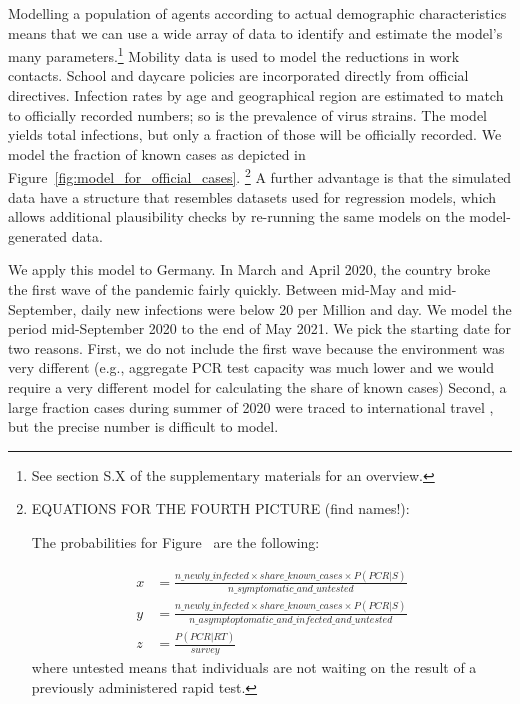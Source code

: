 Modelling a population of agents according to actual demographic characteristics means
that we can use a wide array of data to identify and estimate the model's many
parameters.\footnote{See section S.X of the supplementary materials for an
overview.} Mobility data is used to
model the reductions in work contacts. School and daycare policies are incorporated
directly from official directives. Infection rates by age and geographical region are
estimated to match to officially recorded numbers; so is the prevalence of virus
strains. The model yields total infections, but only a fraction of those will be
officially recorded. We model the fraction of known cases as depicted in
Figure~\ref{fig:model_for_official_cases}.
\footnote{EQUATIONS FOR THE FOURTH PICTURE (find names!):

    The probabilities for Figure~ are the
    following:

    \begin{align*}
        x & = \frac{n\_newly\_infected \times share\_known\_cases \times P(PCR | S)}{n\_symptomatic\_and\_untested}                    \\
        y & = \frac{n\_newly\_infected \times share\_known\_cases \times P(PCR | S)}{n\_asymptoptomatic\_and\_infected\_and\_untested} \\
        z & = \frac{P(PCR | RT)}{survey}
    \end{align*}
    where untested means that individuals are not waiting on the result of a previously
    administered rapid test.} A further advantage is that the simulated data have a
    structure that resembles datasets used for regression models, which allows
    additional plausibility checks by re-running the same models on the model-generated
    data.

We apply this model to Germany. In March and April 2020, the country broke the first
wave of the pandemic fairly quickly. Between mid-May and mid-September, daily new
infections were below 20 per Million and day. We
model the period mid-September 2020 to the end of May 2021. We pick the starting date
for two reasons. First, we do not include the first wave because the environment was
very different (e.g., aggregate PCR test capacity was much lower and we would require a
very different model for calculating the share of known cases) Second, a large fraction
cases during summer of 2020 were traced to international travel
\citep{KochInstitut2021}, but the precise
number is difficult to model.

